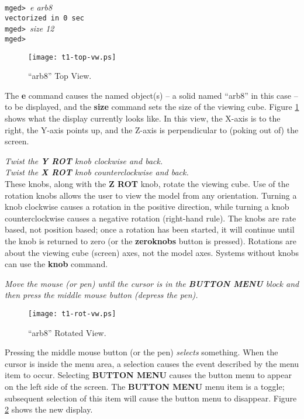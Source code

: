 \noindent
{\tt mged>\ }{\em e arb8}\\
{\tt vectorized in 0 sec}\\
{\tt mged>\ }{\em size 12}\\
{\tt mged> }\\

\begin{figure}
\centering \texttt{[image: t1-top-vw.ps]}
\caption{``arb8'' Top View.}
\label{t1-top-vw}
\end{figure}

The {\bf e} command causes the named object(s) -- a solid named ``arb8''
in this case
-- to be displayed, and the {\bf size} command sets the size of the
viewing cube. Figure \ref{t1-top-vw} shows what the display currently
looks like.  In this view, the X-axis is to the right, the Y-axis points
up, and the Z-axis is perpendicular to (poking out of) the screen.

\noindent
{\em Twist the {\bf Y ROT} knob clockwise and back.}\\
{\em Twist the {\bf X ROT} knob counterclockwise and back.}\\

These knobs, along with the {\bf Z ROT} knob, rotate the viewing cube.
Use of the rotation
knobs allows the user to view the model from any orientation.
Turning a knob clockwise causes a rotation in the positive direction,
while turning a knob counterclockwise causes a negative rotation
(right-hand rule).  The knobs are rate based, not position based;
once a rotation has been started, it will continue until the
knob is returned to zero (or the {\bf zeroknobs} button is pressed).
Rotations are about the viewing cube (screen) axes, not the model axes.
Systems without knobs can use the {\bf knob} command.

\noindent
{\em Move the mouse (or pen) until the cursor is in the {\bf BUTTON MENU}
block and then press the middle mouse button (depress the pen).}\\

\begin{figure}
\centering \texttt{[image: t1-rot-vw.ps]}
\caption{``arb8'' Rotated View.}
\label{t1-rot-vw}
\end{figure}

Pressing the middle mouse button (or the pen) {\sl selects} something.
When the cursor is inside the menu area, a selection
causes the event described by the menu item to occur.
Selecting {\bf BUTTON MENU} causes the button menu to appear on the left
side of the screen. The {\bf BUTTON MENU} menu item is
a toggle; subsequent selection of this item will cause the button menu
to disappear.
Figure \ref{t1-rot-vw} shows the new display.

